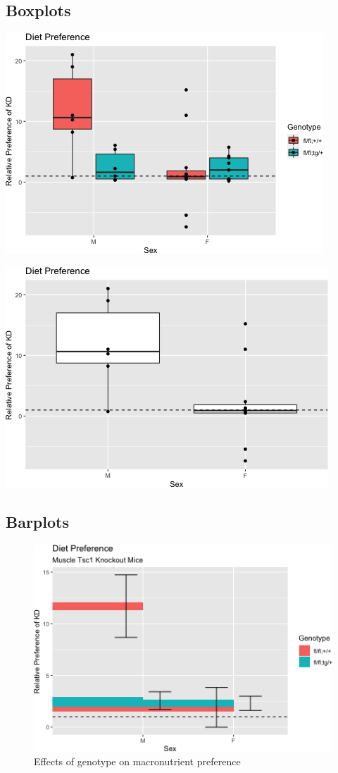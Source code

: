 \documentclass[]{article}
\begin{document}
\hypertarget{boxplots}{%
\subsection{Boxplots}\label{boxplots}}

\includegraphics{figures/knockout-effects-boxplot-1.png}

\includegraphics{figures/sex-effects-boxplot-1.png}

\hypertarget{barplots}{%
\subsection{Barplots}\label{barplots}}

\begin{figure}
\centering
\includegraphics{figures/knockout-effects-barplot-relative-preference-1.png}
\caption{Effects of genotype on macronutrient preference}
\end{figure}
\end{document}
